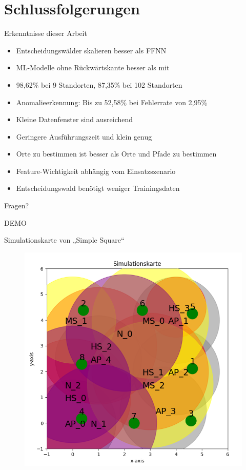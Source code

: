 \documentclass[10pt]{beamer}
\begin{document}
\section{Schlussfolgerungen}
\begin{frame}{Erkenntnisse dieser Arbeit}
    \begin{itemize}
        \item Entscheidungswälder skalieren besser als FFNN
        \item ML-Modelle ohne Rückwärtskante besser als mit
        \item 98,62\% bei 9 Standorten, 87,35\% bei 102 Standorten
        \item Anomalieerkennung: Bis zu 52,58\% bei Fehlerrate von 2,95\%
        \item Kleine Datenfenster sind ausreichend
        \item Geringere Ausführungszeit und klein genug
        \item Orte zu bestimmen ist besser als Orte und Pfade zu bestimmen
        \item Feature-Wichtigkeit abhängig vom Einsatzszenario
        \item Entscheidungswald benötigt weniger Trainingsdaten
    \end{itemize}
\end{frame}

\begin{frame}[standout]
  Fragen?
\end{frame}

\begin{frame}[standout]
  DEMO
\end{frame}

\begin{frame}{Simulationskarte von „Simple Square“}
    \begin{figure}
        \centering
        \includegraphics[width=0.75\linewidth]{settings/simple_square_simulation_map.png}
    \end{figure}
\end{frame}
\end{document}
